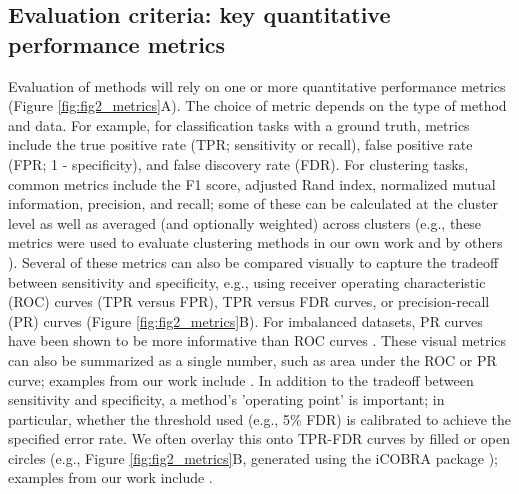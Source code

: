 \subsection{Evaluation criteria: key quantitative performance metrics}

Evaluation of methods will rely on one or more quantitative performance metrics (Figure  \ref{fig:fig2_metrics}A). The choice of metric depends on the type of method and data. For example, for classification tasks with a ground truth, metrics include the true positive rate (TPR; sensitivity or recall), false positive rate (FPR; 1 - specificity), and false discovery rate (FDR). For clustering tasks, common metrics include the F1 score, adjusted Rand index, normalized mutual information, precision, and recall; some of these can be calculated at the cluster level as well as averaged (and optionally weighted) across clusters (e.g., these metrics were used to evaluate clustering methods in our own work \cite{duo_systematicperformanceevaluation_2018,weber_comparisonclusteringmethods_2016}  and by others \cite{freytag_comparisonclusteringtools_2018,aghaeepour_criticalassessmentautomated_2013,wiwie_comparingperformancebiomedical_2015}). Several of these metrics can also be compared visually to capture the tradeoff between sensitivity and specificity, e.g., using receiver operating characteristic (ROC) curves (TPR versus FPR), TPR versus FDR curves, or precision-recall (PR) curves (Figure \ref{fig:fig2_metrics}B). For imbalanced datasets, PR curves have been shown to be more informative than ROC curves \cite{saito_precisionrecallplotmore_2015,powers_visualizationtradeoffevaluation_2015}. These visual metrics can also be summarized as a single number, such as area under the ROC or PR curve; examples from our work include \cite{weber_diffcytdifferentialdiscovery_2019,soneson_biasrobustnessscalability_2018}. In addition to the tradeoff between sensitivity and specificity, a method's 'operating point' is important; in particular, whether the threshold used (e.g., 5\% FDR) is calibrated to achieve the specified error rate. We often overlay this onto TPR-FDR curves by filled or open circles (e.g., Figure \ref{fig:fig2_metrics}B, generated using the iCOBRA package \cite{soneson_icobraopenreproducible_2016}); examples from our work include \cite{weber_diffcytdifferentialdiscovery_2019,nowicka_drimseqdirichletmultinomialframework_2016,zhou_robustlydetectingdifferential_2014,soneson_differentialanalysesrnaseq_2016}.

